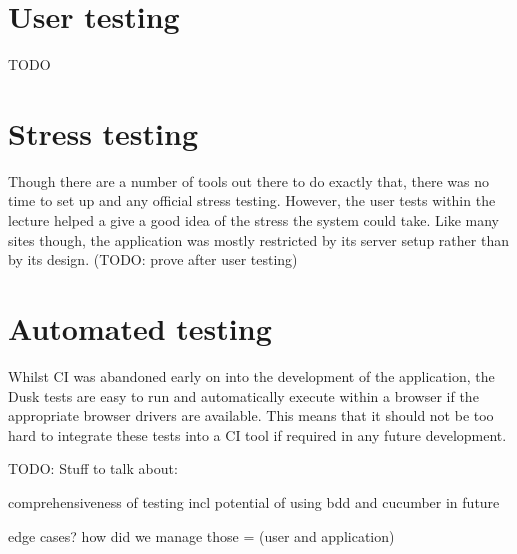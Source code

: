 \section{User testing}
TODO

\section{Stress testing}
Though there are a number of tools out there to do exactly that, there was no time to set up and any official stress testing. However, the user tests within the lecture helped a give a good idea of the stress the system could take. Like many sites though, the application was mostly restricted by its server setup rather than by its design. (TODO: prove after user testing)

\section{Automated testing}
Whilst CI was abandoned early on into the development of the application, the Dusk tests are easy to run and automatically execute within a browser if the appropriate browser drivers are available. This means that it should not be too hard to integrate these tests into a CI tool if required in any future development.


TODO: Stuff to talk about:

comprehensiveness of testing incl potential of using bdd and cucumber in future

edge cases? how did we manage those = (user and application)